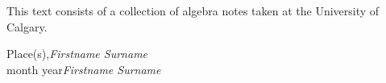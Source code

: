 %
%

\preface

This text consists of a collection of algebra notes taken at the University of Calgary. 
 

\vspace{\baselineskip}
\begin{flushright}\noindent
Place(s),\hfill {\it Firstname  Surname}\\
month year\hfill {\it Firstname  Surname}\\
\end{flushright}


